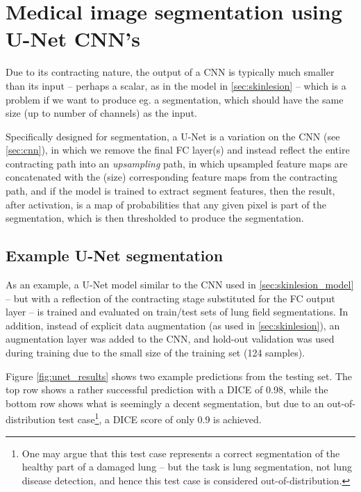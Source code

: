 \section{Medical image segmentation using U-Net CNN's}

Due to its contracting nature, the output of a CNN is typically much smaller
than its input -- perhaps a scalar, as in the model in \cref{sec:skinlesion} --
which is a problem if we want to produce eg. a segmentation, which should have
the same size (up to number of channels) as the input.

Specifically designed for segmentation, a U-Net is a variation on the CNN (see
\cref{sec:cnn}), in which we remove the final FC layer(s) and instead reflect the
entire contracting path into an \emph{upsampling} path, in which upsampled
feature maps are concatenated with the (size) corresponding feature maps from
the contracting path, and if the model is trained to extract segment features,
then the result, after activation, is a map of probabilities that any given
pixel is part of the segmentation, which is then thresholded to produce the
segmentation.


\subsection{Example U-Net segmentation}

As an example, a U-Net model similar to the CNN used in
\cref{sec:skinlesion_model} -- but with a reflection of the contracting stage
substituted for the FC output layer -- is trained and evaluated on train/test
sets of lung field segmentations. In addition, instead of explicit data
augmentation (as used in \cref{sec:skinlesion}), an augmentation layer was added
to the CNN, and hold-out validation was used during training due to the small
size of the training set (124 samples).

Figure \cref{fig:unet_results} shows two example predictions from the testing
set. The top row shows a rather successful prediction with a DICE of 0.98, while
the bottom row shows what is seemingly a decent segmentation, but due to an
out-of-distribution test case\footnote{One may argue that this test case
represents a correct segmentation of the healthy part of a damaged lung -- but
the task is lung segmentation, not lung disease detection, and hence this test
case is considered out-of-distribution.}, a DICE score of only 0.9 is achieved.

\medskip

